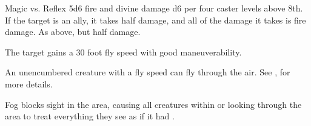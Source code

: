 \begin{spellheader}
    \spellrng{\rngclose}
\end{spellheader}
\begin{spelleffects}
    \begin{spellattack}{Magic vs. Reflex}
        \spellsuccess 5d6 fire and divine damage \add d6 per four caster levels above 8th. If the target is an ally, it takes half damage, and all of the damage it takes is fire damage.
        \spellfailure As above, but half damage.
    \end{spellattack}
\end{spelleffects}
\begin{spellfooter}
    \spellnotes \destructivespellnotes

    \firespellnotes
\end{spellfooter}

\begin{spellheader}
    \spellrng{\rngtouch}
    \spelldur{\durshort}
\end{spellheader}
\begin{spelleffects}
    \spelleffect The target gains a 30 foot fly speed with good maneuverability.
\end{spelleffects}
\begin{spellfooter}
    \spellnotes An unencumbered creature with a fly speed can fly through the air. See , for more details.

\end{spellfooter}%

\begin{spellheader}
    \spelldur{\durshort}
\end{spellheader}
\begin{spelleffects}
    \spelleffect Fog blocks sight in the area, causing all creatures within or looking through the area to treat everything they see as if it had \concealment.
\end{spelleffects}
\begin{spellfooter}
    \spellnotes \fogspellnotes \fogwindspellnotes
\end{spellfooter}

